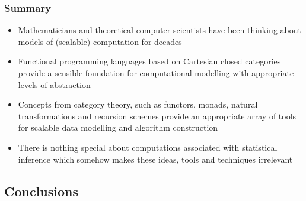 \documentclass[mathserif,handout]{beamer}
\begin{document}
\begin{frame}
  \frametitle{Summary}
  \begin{itemize}
  \item Mathematicians and theoretical computer scientists have been thinking about models of (scalable) computation for decades
  \item Functional programming languages based on Cartesian closed categories provide a sensible foundation for computational modelling with appropriate levels of abstraction
  \item Concepts from category theory, such as functors, monads, natural transformations and recursion schemes provide an appropriate array of tools for scalable data modelling and algorithm construction
    \item There is \alert{nothing special} about computations associated with statistical inference which somehow makes these ideas, tools and techniques irrelevant
  \end{itemize}
\end{frame}

\subsection{Conclusions}
\end{document}
